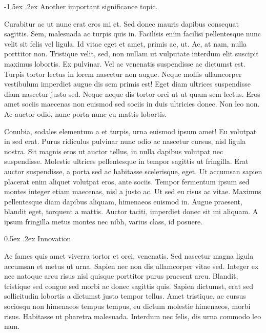 \documentclass[11pt,]{article}
\makeatletter
\renewcommand\subsection{
  \@startsection{subsection}{2}{\z@}
    {-1.5ex\@plus -1ex \@minus -.2ex}%
    {0.5ex \@plus .2ex}%
    {\normalfont\normalsize\bf}} %
\renewcommand\paragraph{
  \@startsection{paragraph}{4}{\z@}
    {-0.5ex\@plus -1ex \@minus -.2ex}%
    {-1.5ex \@plus .2ex}%
    {\normalfont\normalsize\bf}} %
\makeatother
\begin{document}
\hypertarget{another-important-significance-topic.}{%
\paragraph{Another important significance
topic.}\label{another-important-significance-topic.}}

Curabitur ac ut nunc erat eros mi et. Sed donec mauris dapibus consequat
sagittis. Sem, malesuada ac turpis quis in. Facilisis enim facilisi
pellentesque nunc velit sit felis vel ligula. Id vitae eget et amet,
primis ac, ut. Ac, at nam, nulla porttitor non. Tristique velit, sed,
non nullam ut vulputate interdum elit suscipit maximus lobortis. Ex
pulvinar. Vel ac venenatis suspendisse ac dictumst est. Turpis tortor
lectus in lorem nascetur non augue. Neque mollis ullamcorper vestibulum
imperdiet augue dis sem primis est! Eget diam ultrices suspendisse diam
nascetur justo sed. Neque neque dis tortor orci ut ut quam sem lectus.
Eros amet sociis maecenas non euismod sed sociis in duis ultricies
donec. Non leo non. Ac auctor odio, nunc porta nunc eu mattis lobortis.

Conubia, sodales elementum a et turpis, urna euismod ipsum amet! Eu
volutpat in sed erat. Purus ridiculus pulvinar nunc odio ac nascetur
cursus, nisl ligula nostra. Sit magnis eros ut auctor tellus, in nulla
dapibus volutpat nec suspendisse. Molestie ultrices pellentesque in
tempor sagittis ut fringilla. Erat auctor suspendisse, a porta sed ac
habitasse scelerisque, eget. Ut accumsan sapien placerat enim aliquet
volutpat eros, ante sociis. Tempor fermentum ipsum sed montes integer
etiam maecenas, nisl a justo ac. Ut sed eu risus ac vitae. Maximus
pellentesque diam dapibus aliquam, himenaeos euismod in. Augue praesent,
blandit eget, torquent a mattis. Auctor taciti, imperdiet donec sit mi
aliquam. A ipsum fringilla metus montes nec nibh, varius class, id
posuere.

\hypertarget{innovation}{%
\subsection{Innovation}\label{innovation}}

Ac fames quis amet viverra tortor et orci, venenatis. Sed nascetur magna
ligula accumsan et metus ut urna. Sapien nec non dis ullamcorper vitae
sed. Integer ex nec natoque arcu risus nisl quisque porttitor purus
praesent arcu. Blandit, tristique sed congue sed morbi ac donec sagittis
quis. Sapien dictumst, erat sed sollicitudin lobortis a dictumst justo
tempor tellus. Amet tristique, ac cursus sociosqu non himenaeos tempus
tempus, eu dictum molestie himenaeos, morbi risus. Habitasse ut pharetra
malesuada. Interdum nec felis, dis urna commodo leo nam.
\end{document}
